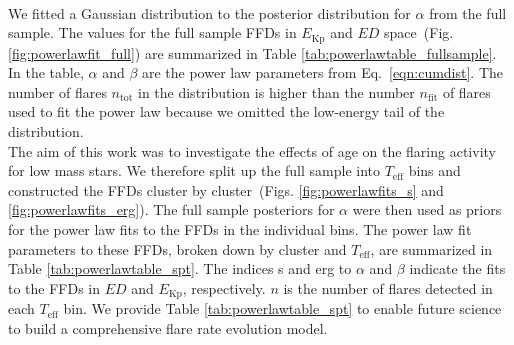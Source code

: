 \documentclass{aa}
\begin{document}
\\
We fitted a Gaussian distribution to the posterior distribution for $\alpha$ from the full sample. The values for the full sample FFDs in $E_\mathrm{Kp}$ and $ED$ space~(Fig. \ref{fig:powerlawfit_full}) are summarized in Table \ref{tab:powerlawtable_fullsample}. In the table, $\alpha$ and $\beta$ are the power law parameters from Eq.~\ref{eqn:cumdist}. The number of flares $n_\mathrm{tot}$ in the distribution is higher than the number $n_\mathrm{fit}$ of flares used to fit the power law because we omitted the low-energy tail of the distribution.
\\
The aim of this work was to investigate the effects of age on the flaring activity for low mass stars. We therefore split up the full sample into $T_\mathrm{eff}$ bins and constructed the FFDs cluster by cluster~(Figs. \ref{fig:powerlawfits_s} and \ref{fig:powerlawfits_erg}). The full sample posteriors for $\alpha$ were then used as priors for the power law fits to the FFDs in the individual bins. The power law fit parameters to these FFDs, broken down by cluster and $T_\mathrm{eff}$, are summarized in Table \ref{tab:powerlawtable_spt}. The indices s and erg to $\alpha$ and $\beta$ indicate the fits to the FFDs in $ED$ and $E_\mathrm{Kp}$, respectively. $n$ is the number of flares detected in each $T_\mathrm{eff}$ bin. We provide Table \ref{tab:powerlawtable_spt} to enable future science to build a comprehensive flare rate evolution model.
\end{document}

